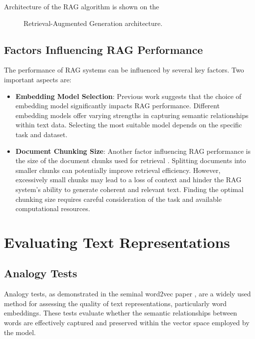 Architecture of the \ac{RAG} algorithm is shown on the 

\begin{figure}[h]
  \centering
  
  \caption{Retrieval-Augmented Generation architecture.}
  \label{fig:RAG_scheme}
\end{figure}

\subsection{Factors Influencing RAG Performance}
The performance of \ac{RAG} systems can be influenced by several key factors.
Two important aspects are:

\begin{itemize}
    \item \textbf{Embedding Model Selection}:
        Previous work \cite{joshi2024RAGemb} suggests that the choice of embedding model significantly impacts \ac{RAG} performance.
        Different embedding models offer varying strengths in capturing semantic relationships within text data.
        Selecting the most suitable model depends on the specific task and dataset.
    \item \textbf{Document Chunking Size}:
        Another factor influencing \ac{RAG} performance is the size of the document chunks used for retrieval \cite{theja2023RAGchunk}.
        Splitting documents into smaller chunks can potentially improve retrieval efficiency.
        However, excessively small chunks may lead to a loss of context and hinder the \ac{RAG} system's ability to generate coherent and relevant text.
        Finding the optimal chunking size requires careful consideration of the task and available computational resources.    
\end{itemize}

\section{Evaluating Text Representations}

\subsection{Analogy Tests}

Analogy tests, as demonstrated in the seminal word2vec paper \cite{word2vec}, are a widely used method for assessing the quality of text representations, particularly word embeddings.
These tests evaluate whether the semantic relationships between words are effectively captured and preserved within the vector space employed by the model.

